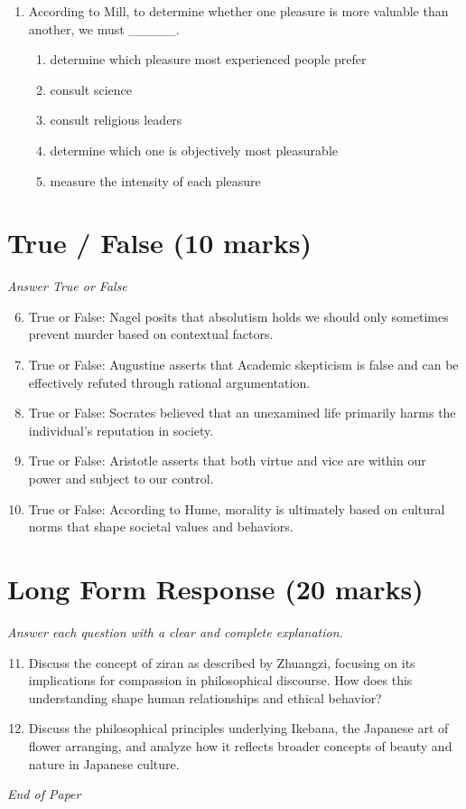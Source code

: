 \documentclass[12pt]{article}
\begin{document}
\begin{enumerate}[label=\arabic*.]
\begin{enumerate}[label=(\alph*)]
    \item failure to perform one's covenant.
    \item treating another person as a mere means.
    \item manipulating others for personal gain.
\end{enumerate}
\item According to Mill, to determine whether one pleasure is more valuable than another, we must \_\_\_\_\_.
\begin{enumerate}[label=(\alph*)]
    \item determine which pleasure most experienced people prefer
    \item consult science
    \item consult religious leaders
    \item determine which one is objectively most pleasurable
    \item measure the intensity of each pleasure
\end{enumerate}
\end{enumerate}

\section*{True / False (10 marks)}
\textit{Answer True or False}
\begin{enumerate}[label=\arabic*.]
\setcounter{enumi}{5}
\item True or False: Nagel posits that absolutism holds we should only sometimes prevent murder based on contextual factors.
\item True or False: Augustine asserts that Academic skepticism is false and can be effectively refuted through rational argumentation.
\item True or False: Socrates believed that an unexamined life primarily harms the individual's reputation in society.
\item True or False: Aristotle asserts that both virtue and vice are within our power and subject to our control.
\item True or False: According to Hume, morality is ultimately based on cultural norms that shape societal values and behaviors.
\end{enumerate}

\section*{Long Form Response (20 marks)}
\textit{Answer each question with a clear and complete explanation.}
\begin{enumerate}[label=\arabic*.]
\setcounter{enumi}{10}
\item Discuss the concept of ziran as described by Zhuangzi, focusing on its implications for compassion in philosophical discourse. How does this understanding shape human relationships and ethical behavior?
\item Discuss the philosophical principles underlying Ikebana, the Japanese art of flower arranging, and analyze how it reflects broader concepts of beauty and nature in Japanese culture.
\end{enumerate}

\vfill
\noindent\textit{End of Paper}
\end{document}
